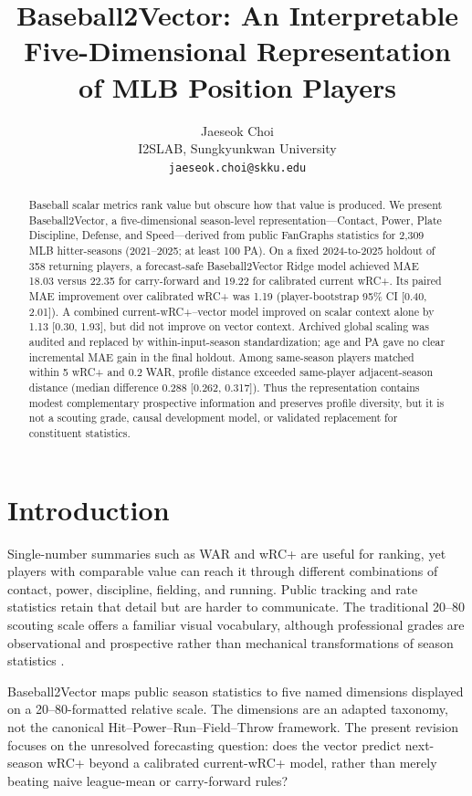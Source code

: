 \documentclass[10pt,twocolumn,letterpaper]{article}
\title{Baseball2Vector: An Interpretable Five-Dimensional Representation of MLB Position Players}
\author{Jaeseok Choi\\I2SLAB, Sungkyunkwan University\\\texttt{jaeseok.choi@skku.edu}}
\date{}
\begin{document}
\maketitle

\begin{abstract}
Baseball scalar metrics rank value but obscure how that value is produced. We present Baseball2Vector, a five-dimensional season-level representation---Contact, Power, Plate Discipline, Defense, and Speed---derived from public FanGraphs statistics for 2,309 MLB hitter-seasons (2021--2025; at least 100 PA). On a fixed 2024-to-2025 holdout of 358 returning players, a forecast-safe Baseball2Vector Ridge model achieved MAE 18.03 versus 22.35 for carry-forward and 19.22 for calibrated current wRC+. Its paired MAE improvement over calibrated wRC+ was 1.19 (player-bootstrap 95\% CI [0.40, 2.01]). A combined current-wRC+--vector model improved on scalar context alone by 1.13 [0.30, 1.93], but did not improve on vector context. Archived global scaling was audited and replaced by within-input-season standardization; age and PA gave no clear incremental MAE gain in the final holdout. Among same-season players matched within 5 wRC+ and 0.2 WAR, profile distance exceeded same-player adjacent-season distance (median difference 0.288 [0.262, 0.317]). Thus the representation contains modest complementary prospective information and preserves profile diversity, but it is not a scouting grade, causal development model, or validated replacement for constituent statistics.
\end{abstract}

\section{Introduction}
Single-number summaries such as WAR and wRC+ are useful for ranking, yet players with comparable value can reach it through different combinations of contact, power, discipline, fielding, and running. Public tracking and rate statistics retain that detail but are harder to communicate. The traditional 20--80 scouting scale offers a familiar visual vocabulary, although professional grades are observational and prospective rather than mechanical transformations of season statistics \cite{mcdaniel2014}.

Baseball2Vector maps public season statistics to five named dimensions displayed on a 20--80-formatted relative scale. The dimensions are an adapted taxonomy, not the canonical Hit--Power--Run--Field--Throw framework. The present revision focuses on the unresolved forecasting question: does the vector predict next-season wRC+ beyond a calibrated current-wRC+ model, rather than merely beating naive league-mean or carry-forward rules?
\end{document}

